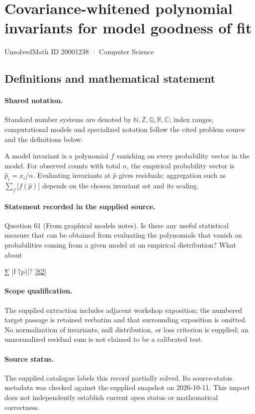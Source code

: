 \documentclass[11pt]{article}
\newcommand{\sref}[2]{\hyperlink{source:#1:#2}{[S#2]}}
\begin{document}
\setcounter{section}{20001237}
\section{Covariance-whitened polynomial invariants for model goodness of fit}\label{20001238}
{\small\sffamily UnsolvedMath ID 20001238 · Computer Science}
\subsection{Definitions and mathematical statement}

\paragraph{Shared notation.}Standard number systems are denoted by $\mathbb N,\mathbb Z,\mathbb Q,\mathbb R,\mathbb C$; index ranges, computational models and specialized notation follow the cited problem source and the definitions below.


A model invariant is a polynomial $f$ vanishing on every probability vector in the model. For observed counts with total $n$, the empirical probability vector is $\widehat p_i=x_i/n$. Evaluating invariants at $\widehat p$ gives residuals; aggregation such as $\sum_f|f(\widehat p)|$ depends on the chosen invariant set and its scaling.
\paragraph{Statement recorded in the supplied source.}
Question 61 (From graphical models notes). Is there any useful statistical measure that can be obtained from evaluating the polynomials that vanish on probabilities coming from a given model at an empirical distribution? What about

∑ |f (̂p)|? \sref{20001238}{2}
\paragraph{Scope qualification.}
The supplied extraction includes adjacent workshop exposition; the numbered target passage is retained verbatim and that surrounding exposition is omitted. No normalization of invariants, null distribution, or loss criterion is supplied; an unnormalized residual sum is not claimed to be a calibrated test.
\paragraph{Source status.}
The supplied catalogue labels this record partially solved. Its source-status metadata was checked against the supplied snapshot on 2026-10-11. This import does not independently establish current open status or mathematical correctness.
\end{document}
